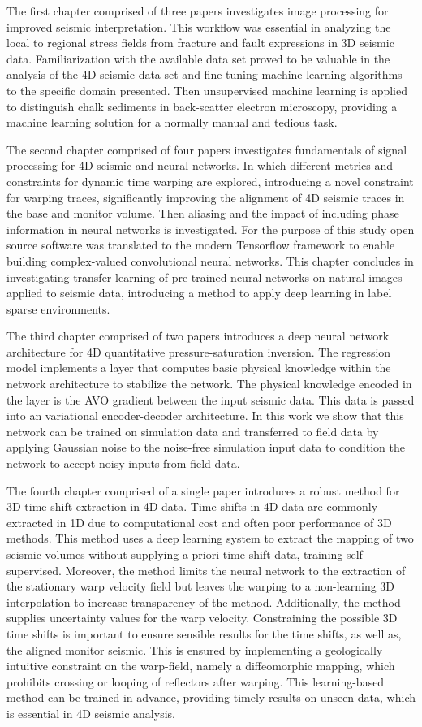 The first chapter comprised of three papers investigates image processing for improved seismic interpretation. This workflow was essential in analyzing the local to regional stress fields from fracture and fault expressions in 3D seismic data. Familiarization with the available data set proved to be valuable in the analysis of the 4D seismic data set and fine-tuning machine learning algorithms to the specific domain presented. Then unsupervised machine learning is applied to distinguish chalk sediments in back-scatter electron microscopy, providing a machine learning solution for a normally manual and tedious task.

The second chapter comprised of four papers investigates fundamentals of signal processing for 4D seismic and neural networks. In which different metrics and constraints for dynamic time warping are explored, introducing a novel constraint for warping traces, significantly improving the alignment of 4D seismic traces in the base and monitor volume. Then aliasing and the impact of including phase information in neural networks is investigated. For the purpose of this study open source software was translated to the modern Tensorflow framework to enable building complex-valued convolutional neural networks. This chapter concludes in investigating transfer learning of pre-trained neural networks on natural images applied to seismic data, introducing a method to apply deep learning in label sparse environments.

The third chapter comprised of two papers introduces a deep neural network architecture for 4D quantitative pressure-saturation inversion. The regression model implements a layer that computes basic physical knowledge within the network architecture to stabilize the network. The physical knowledge encoded in the layer is the AVO gradient between the input seismic data. This data is passed into an variational encoder-decoder architecture. In this work we show that this network can be trained on simulation data and transferred to field data by applying Gaussian noise to the noise-free simulation input data to condition the network to accept noisy inputs from field data.

The fourth chapter comprised of a single paper introduces a robust method for 3D time shift extraction in 4D data. Time shifts in 4D data are commonly extracted in 1D due to computational cost and often poor performance of 3D methods. This method uses a deep learning system to extract the mapping of two seismic volumes without supplying a-priori time shift data, training self-supervised. Moreover, the method limits the neural network to the extraction of the stationary warp velocity field but leaves the warping to a non-learning 3D interpolation to increase transparency of the method. Additionally, the method supplies uncertainty values for the warp velocity. Constraining the possible 3D time shifts is important to ensure sensible results for the time shifts, as well as, the aligned monitor seismic. This is ensured by implementing a geologically intuitive constraint on the warp-field, namely a diffeomorphic mapping, which prohibits crossing or looping of reflectors after warping. This learning-based method can be trained in advance, providing timely results on unseen data, which is essential in 4D seismic analysis.